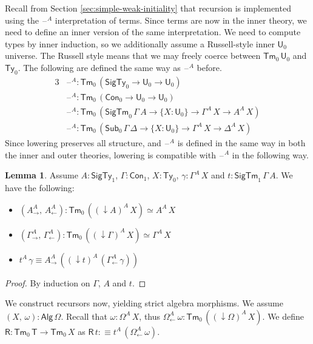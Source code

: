 \documentclass[12pt,a4paper,twoside,openany]{book}
\theoremstyle{remark}
\theoremstyle{definition}
\newtheorem{mylemma}{Lemma}
\theoremstyle{theorem}
\newcommand{\ms}[1]{\mathsf{#1}}
\newcommand{\Con}{\mathsf{Con}}
\newcommand{\Sub}{\mathsf{Sub}}
\newcommand{\Tm}{\mathsf{Tm}}
\newcommand{\Ty}{\mathsf{Ty}}
\newcommand{\U}{\mathsf{U}}
\newcommand{\blank}{\mathord{\hspace{1pt}\text{--}\hspace{1pt}}}
\newcommand{\SigTy}{\mathsf{SigTy}}
\newcommand{\SigTm}{\mathsf{SigTm}}
\newcommand{\Alg}{\ms{Alg}}
\newcommand{\down}{\downarrow}
\newcommand{\defn}{:\equiv}
\begin{document}
Recall from Section \ref{sec:simple-weak-initiality} that recursion is
implemented using the $\blank^A$ interpretation of terms. Since terms are now in
the inner theory, we need to define an inner version of the same interpretation.
We need to compute types by inner induction, so we additionally assume a
Russell-style inner $\U_0$ universe. The Russell style means that we may freely
coerce between $\Tm_0\,\U_0$ and $\Ty_0$. The following are defined the same way
as $\blank^A$ before.
\begin{alignat*}{3}
  &\blank^A : \Tm_0\,(\SigTy_0 \to \U_0 \to \U_0)\\
  &\blank^A : \Tm_0\,(\Con_0 \to \U_0 \to \U_0)\\
  &\blank^A : \Tm_0\,(\SigTm_0\,\Gamma\,A \to \{X : \U_0\} \to \Gamma^A\,X \to A^A\,X)\\
  &\blank^A : \Tm_0\,(\Sub_0\,\Gamma\,\Delta \to \{X : \U_0\} \to \Gamma^A\,X \to \Delta^A\,X)
\end{alignat*}
Since lowering preserves all structure, and $\blank^A$ is defined in the same
way in both the inner and outer theories, lowering is compatible with
$\blank^A$ in the following way.
\begin{mylemma}\label{lem:down-compat-alg} Assume $A : \SigTy_1$, $\Gamma : \Con_1$, $X : \Ty_0$, $\gamma : \Gamma^A\,X$ and $t : \SigTm_1\,\Gamma\,A$. We have the following:
  \begin{itemize}
  \item $(A^A_{\to},\,A^A_{\leftarrow}) : \Tm_0\,((\down\!A)^A\,X) \simeq A^A\,X$
  \item $(\Gamma^A_{\to},\,\Gamma^A_{\leftarrow}) : \Tm_0\,((\down\!\Gamma)^A\,X) \simeq \Gamma^A\,X$
  \item $t^A\,\gamma \equiv A^A_{\to}\,((\down\!t)^A\,(\Gamma^A_{\leftarrow}\,\gamma))$
  \end{itemize}
\end{mylemma}
\begin{proof}
By induction on $\Gamma$, $A$ and $t$.
\end{proof}
We construct recursors now, yielding strict algebra morphisms.  We
assume $(X,\,\omega) : \Alg\,\Omega$. Recall that $\omega : \Omega^A\,X$, thus
$\Omega^A_{\leftarrow}\,\omega : \Tm_0\,((\down\!\Omega)^A\,X)$. We define $\ms{R} :
\Tm_0\,\ms{T} \to \Tm_0\,X$ as $\ms{R}\,t \defn t^A\,(\Omega^A_{\leftarrow}\,\omega)$.
\end{document}

